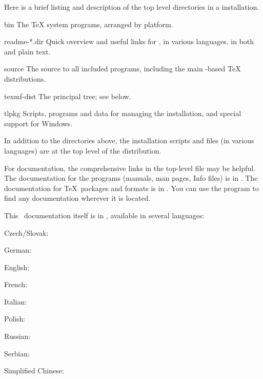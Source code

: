 \documentclass{article}
\begin{document}
Here is a brief listing and description of the top level directories in a
\TL{} installation.  

\begin{ttdescription}
\item[bin] The \TeX{} system programs, arranged by platform.
%
\item[readme-*.dir] Quick overview and useful links for \TL{},
in various languages, in both \HTML{} and plain text.
%
\item[source] The source to all included programs, including the main
  \Webc{}-based \TeX{} distributions.
%
\item[texmf-dist] The principal tree; see  below.
%
\item[tlpkg] Scripts, programs and data for managing the
  installation, and special support for Windows.
\end{ttdescription}

In addition to the directories above, the installation scripts and
 files (in various languages) are at the top level of
the distribution.

For documentation, the comprehensive links in the top-level file
 may be helpful.  The documentation for the programs
(manuals, man pages, Info files) is in .  The
documentation for \TeX\ packages and formats is in
.  You can use the  program to
find any documentation wherever it is located.

This \TL\ documentation itself is in ,
available in several languages:

\begin{itemize*}
\item{Czech/Slovak:} 
\item{German:} 
\item{English:} 
\item{French:} 
\item{Italian:} 
\item{Polish:} 
\item{Russian:} 
\item{Serbian:} 
\item{Simplified Chinese:} 
\end{itemize*}
\end{document}

